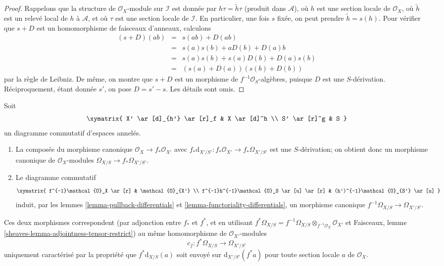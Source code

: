 \begin{proof}
Rappelons que la structure de $\mathcal{O}_X$-module sur $\mathcal{I}$ est
donnée par $h \tau = \tilde h \tau$ (produit dans $\mathcal{A}$), où $h$
est une section locale de $\mathcal{O}_X$, où $\tilde h$ est un relevé
local de $h$ à $\mathcal{A}$, et où $\tau$ est une section locale de
$\mathcal{I}$. En particulier, une fois $s$ fixée, on peut prendre
$\tilde h = s(h)$. Pour vérifier que $s + D$ est un homomorphisme de
faisceaux d'anneaux, calculons
\begin{eqnarray*}
(s + D)(ab) & = & s(ab) + D(ab) \\
& = & s(a)s(b) + aD(b) + D(a)b \\
& = & s(a) s(b) + s(a)D(b) + D(a)s(b) \\
& = & (s(a) + D(a))(s(b) + D(b))
\end{eqnarray*}
par la règle de Leibniz. De même, on montre que $s + D$ est un morphisme de
$f^{-1}\mathcal{O}_S$-algèbres, puisque $D$ est une $S$-dérivation.
Réciproquement, étant donnée $s'$, on pose $D = s' - s$. Les détails sont omis.
\end{proof}

\begin{lemma}
\label{lemma-functoriality-differentials-ringed-spaces}
Soit
$$
\xymatrix{
X' \ar[d]_{h'} \ar[r]_f & X \ar[d]^h \\
S' \ar[r]^g & S
}
$$
un diagramme commutatif d'espaces annelés.
\begin{enumerate}
\item La composée du morphisme canonique
$\mathcal{O}_X \to f_*\mathcal{O}_{X'}$ avec
$f_*\text{d}_{X'/S'} : f_*\mathcal{O}_{X'} \to f_*\Omega_{X'/S'}$ est une
$S$-dérivation; on obtient donc un morphisme canonique de
$\mathcal{O}_X$-modules
$\Omega_{X/S} \to f_*\Omega_{X'/S'}$.
\item Le diagramme commutatif
$$
\xymatrix{
f^{-1}\mathcal{O}_X \ar[r] & \mathcal{O}_{X'} \\
f^{-1}h^{-1}\mathcal{O}_S \ar[u] \ar[r] & (h')^{-1}\mathcal{O}_{S'} \ar[u]
}
$$
induit, par les lemmes \ref{lemma-pullback-differentials} et
\ref{lemma-functoriality-differentials}, un morphisme canonique
$f^{-1}\Omega_{X/S} \to \Omega_{X'/S'}$.
\end{enumerate}
Ces deux morphismes correspondent (par adjonction entre $f_*$ et $f^*$, et
en utilisant $f^*\Omega_{X/S} =
f^{-1}\Omega_{X/S} \otimes_{f^{-1}\mathcal{O}_X} \mathcal{O}_{X'}$ et
Faisceaux, lemme \ref{sheaves-lemma-adjointness-tensor-restrict})
au même homomorphisme de $\mathcal{O}_{X'}$-modules
$$
c_f : f^*\Omega_{X/S} \longrightarrow \Omega_{X'/S'}
$$
uniquement caractérisé par la propriété que
$f^*\text{d}_{X/S}(a)$ soit envoyé sur $\text{d}_{X'/S'}(f^*a)$
pour toute section locale $a$ de $\mathcal{O}_X$.
\end{lemma}

